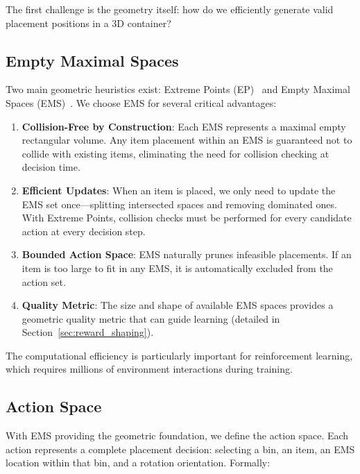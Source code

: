 The first challenge is the geometry itself: how do we efficiently generate valid placement positions in a 3D container?

\subsection{Empty Maximal Spaces}

Two main geometric heuristics exist: Extreme Points (EP)~\cite{crainic2008extreme} and Empty Maximal Spaces (EMS)~\cite{crainic2012packing}. We choose EMS for several critical advantages:

\begin{enumerate}
    \item \textbf{Collision-Free by Construction}: Each EMS represents a maximal empty rectangular volume. Any item placement within an EMS is guaranteed not to collide with existing items, eliminating the need for collision checking at decision time.

    \item \textbf{Efficient Updates}: When an item is placed, we only need to update the EMS set once---splitting intersected spaces and removing dominated ones. With Extreme Points, collision checks must be performed for every candidate action at every decision step.

    \item \textbf{Bounded Action Space}: EMS naturally prunes infeasible placements. If an item is too large to fit in any EMS, it is automatically excluded from the action set.

    \item \textbf{Quality Metric}: The size and shape of available EMS spaces provides a geometric quality metric that can guide learning (detailed in Section~\ref{sec:reward_shaping}).
\end{enumerate}

The computational efficiency is particularly important for reinforcement learning, which requires millions of environment interactions during training.

\subsection{Action Space}

With EMS providing the geometric foundation, we define the action space. Each action represents a complete placement decision: selecting a bin, an item, an EMS location within that bin, and a rotation orientation. Formally:

